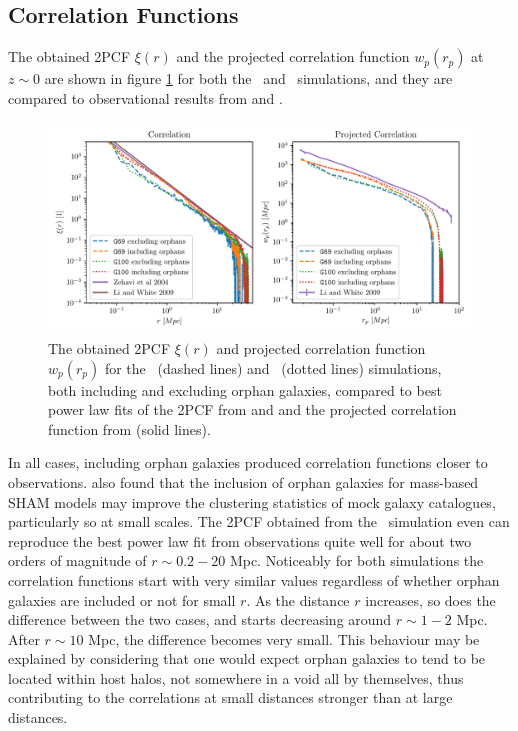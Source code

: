 \subsection{Correlation Functions}\label{chap:correlation}

The obtained 2PCF $\xi(r)$ and the projected correlation function $w_p(r_p)$ at $z\sim 0$ are shown in figure \ref{fig:correlations} for both the \gsmall\ and \glarge\ simulations, and they are compared to observational results from \cite{LiWhite} and \cite{Correlation1}.

\begin{figure}[H]
	\centering
	\includegraphics[width=\textwidth, keepaspectratio]{images/correlations.pdf}%
	\caption{
		The obtained 2PCF $\xi(r)$ and projected correlation function $w_p(r_p)$ for the \gsmall\ (dashed lines) and \glarge\ (dotted lines) simulations, both including and excluding orphan galaxies, compared to best power law fits of the 2PCF from \cite{LiWhite} and \cite{Correlation1} and the projected correlation function  from \cite{LiWhite} (solid lines).
	}%
	\label{fig:correlations}
\end{figure}



In all cases, including orphan galaxies produced correlation functions closer to observations.
\cite{crisis} also found that the inclusion of orphan galaxies for mass-based SHAM models may improve the clustering statistics of mock galaxy catalogues, particularly so at small scales.
The 2PCF obtained from the \glarge\ simulation even can reproduce the best power law fit from observations quite well for about two orders of magnitude of $r\sim 0.2 - 20$ Mpc.
Noticeably for both simulations the correlation functions start with very similar values regardless of whether orphan galaxies are included or not for small $r$. 
As the distance $r$ increases, so does the difference between the two cases, and starts decreasing around $r\sim 1-2 $ Mpc.
After $r\sim 10$ Mpc, the difference becomes very small.
This behaviour may be explained by considering that one would expect orphan galaxies to tend to be located within host halos, not somewhere in a void all by themselves, thus contributing to the correlations at small distances stronger than at large distances.


